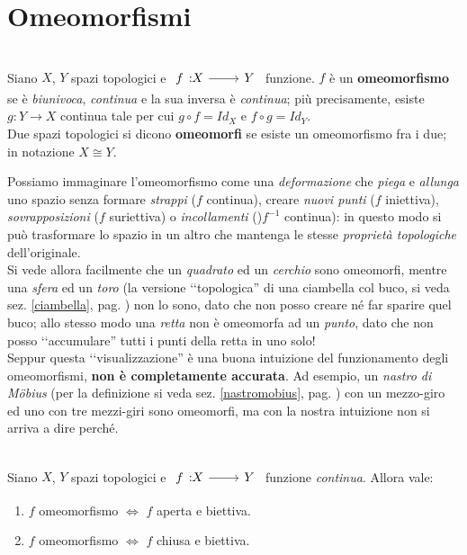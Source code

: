 \section{Omeomorfismi}
\begin{define}[Omeomorfismo.]~{}\\
Siano $X$, $Y$ spazi topologici e $\funz{f}{X}{Y}$ funzione. $f$ è un \textbf{omeomorfismo} se è \textit{biunivoca}, \textit{continua} e la sua inversa è \textit{continua}; più precisamente, esiste $g\colon Y\rightarrow X$ continua tale per cui $g\circ f = Id_{X}$ e $f\circ g = Id_{Y}$.\\
Due spazi topologici si dicono \textbf{omeomorfi} se esiste un omeomorfismo fra i due; in notazione $X\cong Y$.
\end{define}
\begin{intuit}
	Possiamo immaginare l'omeomorfismo come una \textit{deformazione} che \textit{piega} e \textit{allunga} uno spazio senza formare \textit{strappi} ($f$ continua), creare \textit{nuovi punti} ($f$ iniettiva), \textit{sovrapposizioni} ($f$ suriettiva) o \textit{incollamenti} ()$f^{-1}$ continua): in questo modo si può trasformare lo spazio in un altro che mantenga le stesse \textit{proprietà topologiche} dell'originale.\\
	Si vede allora facilmente che un \textit{quadrato} ed un \textit{cerchio} sono omeomorfi, mentre una \textit{sfera} ed un \textit{toro} (la versione ‘‘topologica'' di una ciambella col buco, si veda sez. \ref{ciambella}, pag. \pageref{ciambella}) non lo sono, dato che non posso creare né far sparire quel buco; allo stesso modo una \textit{retta} non è omeomorfa ad un \textit{punto}, dato che non posso ‘‘accumulare'' tutti i punti della retta in uno solo!\\
	Seppur questa ‘‘visualizzazione'' è una buona intuizione del funzionamento degli omeomorfismi, \textbf{non è completamente accurata}. Ad esempio, un \textit{nastro di Möbius} (per la definizione si veda sez. \ref{nastromobius}, pag. \pageref{nastromobius}) con un mezzo-giro ed uno con tre mezzi-giri sono omeomorfi, ma con la nostra intuizione non si arriva a dire perché.
\end{intuit}
\begin{lemming}~{}\\
Siano $X$, $Y$ spazi topologici e $\funz{f}{X}{Y}$ funzione \textit{continua}. Allora vale:
\begin{enumerate}
\item $f$ omeomorfismo $\iff$ $f$ aperta e biettiva.
\item $f$ omeomorfismo $\iff$ $f$ chiusa e biettiva.
\end{enumerate}
\vspace{-3mm}
\end{lemming}
